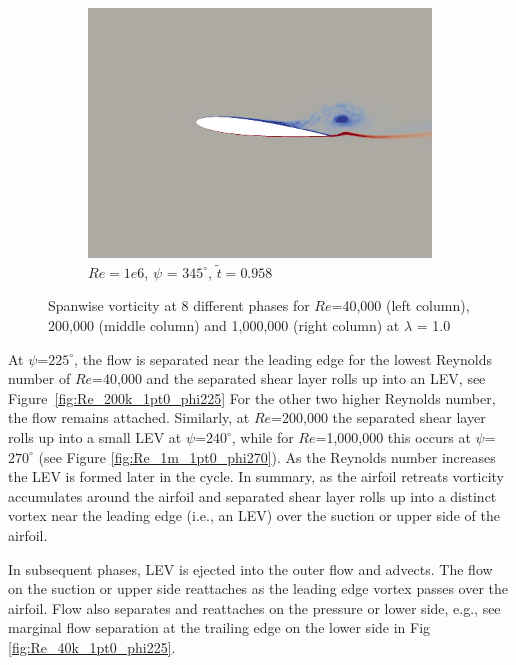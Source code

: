 \begin{figure}[H]
\begin{subfigure}[b]{0.32\textwidth}
		\includegraphics[width=1\textwidth]{figures/Vorticity_plots/Re_1m_1pt0/phase_345.png}
		\caption{$Re=1e6$, $\psi$ = $345^\circ$, $\tilde{t}=0.958$}
		\label{fig:Re_1m_1pt0_phi345}
	\end{subfigure}	
\caption{Spanwise vorticity at 8 different phases for $Re$=40,000 (left column), 200,000 (middle column) and 1,000,000 (right column) at $\lambda$ = 1.0}
\label{fig:vortScreen_1pt0}
\end{figure}


At $\psi$=$225^\circ$, the flow is separated near the leading edge for the lowest Reynolds number of $Re$=40,000 and the separated shear layer rolls up into an LEV, see Figure~\ref{fig:Re_200k_1pt0_phi225}
For the other two higher Reynolds number, the flow remains attached.
Similarly, at $Re$=200,000 the separated shear layer rolls up into a small LEV at $\psi$=$240^\circ$, while for $Re$=1,000,000 this occurs at $\psi$=$270^\circ$ (see Figure \ref{fig:Re_1m_1pt0_phi270}).
As the Reynolds number increases the LEV is formed later in the cycle.
In summary, as the airfoil retreats vorticity accumulates around the airfoil and separated shear layer rolls up into a distinct vortex near the leading edge (i.e., an LEV) over the suction or upper side of the airfoil.

In subsequent phases, LEV is ejected into the outer flow and advects.
The flow on the suction or upper side reattaches as the leading edge vortex passes over the airfoil.
Flow also separates and reattaches on the pressure or lower side, e.g., see marginal flow separation at the trailing edge on the lower side in Fig \ref{fig:Re_40k_1pt0_phi225}.

